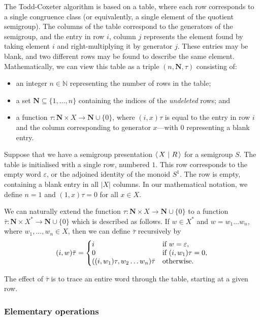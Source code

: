 The Todd-Coxeter algorithm is based on a table, where each row corresponds to a
single congruence class (or equivalently, a single element of the quotient
semigroup).  The columns of the table correspond to the generators of the
semigroup, and the entry in row $i$, column $j$ represents the element found by
taking element $i$ and right-multiplying it by generator $j$.  These entries may
be blank, and two different rows may be found to describe the same element.
Mathematically, we can view this table as a triple $(n, \mathbf{N}, \tau)$
consisting of:
\begin{itemize}
\item an integer $n \in \mathbb{N}$ representing the number of rows in the table;
\item a set $\mathbf{N} \subseteq \{1, \ldots, n\}$ containing the indices of the
  \textit{undeleted} rows; and
\item a function $\tau: \mathbf{N} \times X \to \mathbf{N} \cup \{0\}$, where
  $(i, x)\tau$ is equal to the entry in row $i$ and the column corresponding to
  generator $x$---with $0$ representing a blank entry.
\end{itemize}

Suppose that we have a semigroup presentation $\left\langle\,X ~\middle|~ R\,\right\rangle$ for a semigroup
$S$.  The table is initialised with a single row, numbered $1$.  This row
corresponds to the empty word $\varepsilon$, or the adjoined identity of the
monoid $S^1$.  The row is empty, containing a blank entry in all $|X|$ columns.
In our mathematical notation, we define $n=1$ and
$(1,x)\tau = 0$ for all $x \in X$.

We can naturally extend the function
$\tau: \mathbf{N} \times X \to \mathbf{N} \cup \{0\}$
to a function 
$\bar{\tau}: \mathbf{N} \times X^* \to \mathbf{N} \cup \{0\}$
which is described as follows.
If $w \in X^*$ and $w=w_1 \ldots w_n$, where $w_1, \ldots, w_n \in X$,
then we can define $\bar\tau$ recursively by
$$
(i, w)\bar\tau = \left\{
\begin{matrix*}[l]
  i & \textnormal{if~} w=\varepsilon,\\
  0 & \textnormal{if~} (i, w_1)\tau=0,\\
  ((i, w_1)\tau, w_2 \ldots w_n)\bar\tau & \textnormal{otherwise}.
\end{matrix*} \right.
$$

The effect of $\bar\tau$ is to trace an entire word through the table, starting
at a given row.

\subsubsection{Elementary operations}

